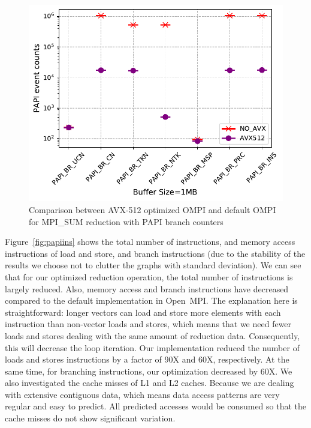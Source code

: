 \documentclass[5p,times,twocolumn]{elsarticle}
\newcommand{\ompi}[0]{Open~MPI\xspace}
\begin{document}
\begin{figure}[h]
    \centering
    \includegraphics[width=\linewidth]{papi_BR_review.pdf}
    \caption{Comparison between AVX-512 optimized OMPI and default OMPI for MPI\_SUM reduction with PAPI branch counters}
    \label{fig:papibr}
\end{figure}

Figure~\ref{fig:papiins} shows the total number of instructions, and memory access instructions of
load and store, and branch instructions (due to the
stability of the results we choose not to clutter the graphs with
standard deviation).
We can see that for our optimized reduction operation, the total number of
instructions is largely reduced. Also, memory access and branch instructions
have decreased compared to the default implementation in \ompi.
The explanation here is straightforward: longer vectors can load and store more
elements with each instruction than non-vector loads and stores, which means that
we need fewer loads and stores dealing with the same amount of reduction data.
Consequently, this will decrease the loop iteration.
%
Our implementation reduced the number of loads and stores instructions
by a factor of 90X and 60X, respectively.  At the same time, for
branching instructions, our optimization decreased by 60X.  We also
investigated the cache misses of L1 and L2 caches. Because we are
dealing with extensive contiguous data, which means data access
patterns are very regular and easy to predict. All predicted accesses
would be consumed so that the cache misses do not show significant
variation.
\end{document}
